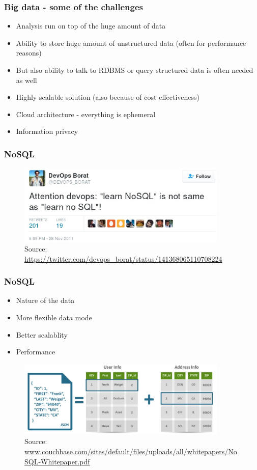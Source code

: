 \documentclass[10pt,utf8]{beamer}
\begin{document}
\begin{frame}
	\frametitle{Big data - some of the challenges}
		\begin{itemize}
			\item Analysis run on top of the huge amount of data
			\item Ability to store huge amount of unstructured data (often for performance reasons)
			\item But also ability  to talk to RDBMS or query structured data is often needed as well
			\item Highly scalable solution (also because of cost effectiveness)
			\item Cloud architecture - everything is ephemeral
			\item Information privacy
		\end{itemize}
\end{frame}

\begin{frame}
	\frametitle{NoSQL}
	 {
		\begin{figure}
			\centering
			\includegraphics[width=10cm]{./img/borat_learn_nosql.eps}
			\caption{\tiny{Source: \url{https://twitter.com/devops_borat/status/141368065110708224}}}
		\end{figure}
	}
\end{frame}

\begin{frame}
	\frametitle{NoSQL}
	\begin{itemize}
		\item Nature of the data
		\pause
		\item More flexible data mode
		\pause
		\item Better scalablity
		\pause
		\item Performance
	\end{itemize}
	\begin{figure}
		\centering
		\includegraphics[width=10cm]{./img/json_vs_sql.eps}
		\caption{\tiny{Source: \url{www.couchbase.com/sites/default/files/uploads/all/whitepapers/NoSQL-Whitepaper.pdf}}}
	\end{figure}
\end{frame}
\end{document}
